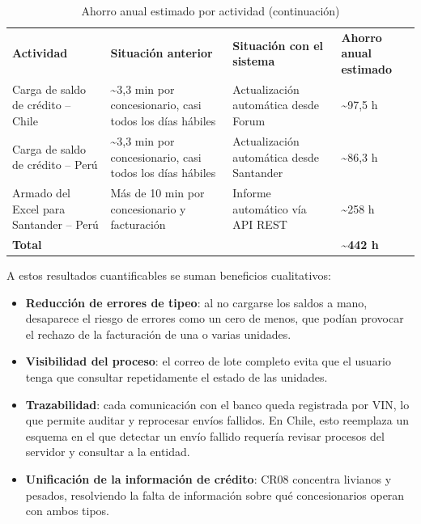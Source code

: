 \begin{longtable}[]{@{}
  >{\raggedright\arraybackslash}p{}
  >{\raggedright\arraybackslash}p{}
  >{\raggedright\arraybackslash}p{}
  >{\raggedright\arraybackslash}p{}@{}}
\caption{Ahorro anual estimado por actividad}\label{tab:18}\\
\toprule\noalign{}
\endfirsthead
\caption[]{Ahorro anual estimado por actividad (continuación)}\\
\toprule\noalign{}
\endhead
\bottomrule\noalign{}
\endlastfoot
\textbf{Actividad} & \textbf{Situación anterior} & \textbf{Situación con el sistema} & \textbf{Ahorro anual estimado} \\
Carga de saldo de crédito -- Chile & \textasciitilde3,3 min por concesionario, casi todos los días hábiles & Actualización automática desde Forum & \textasciitilde97,5 h \\
Carga de saldo de crédito -- Perú & \textasciitilde3,3 min por concesionario, casi todos los días hábiles & Actualización automática desde Santander & \textasciitilde86,3 h \\
Armado del Excel para Santander -- Perú & Más de 10 min por concesionario y facturación & Informe automático vía API REST & \textasciitilde258 h \\
\textbf{Total} & & & \textbf{\textasciitilde442 h} \\
\end{longtable}

A estos resultados cuantificables se suman beneficios cualitativos:

\begin{itemize}
\item \textbf{Reducción de errores de tipeo}: al no cargarse los saldos a mano, desaparece el riesgo de errores como un cero de menos, que podían provocar el rechazo de la facturación de una o varias unidades.
\item \textbf{Visibilidad del proceso}: el correo de lote completo evita que el usuario tenga que consultar repetidamente el estado de las unidades.
\item \textbf{Trazabilidad}: cada comunicación con el banco queda registrada por VIN, lo que permite auditar y reprocesar envíos fallidos. En Chile, esto reemplaza un esquema en el que detectar un envío fallido requería revisar procesos del servidor y consultar a la entidad.
\item \textbf{Unificación de la información de crédito}: CR08 concentra livianos y pesados, resolviendo la falta de información sobre qué concesionarios operan con ambos tipos.
\end{itemize}
